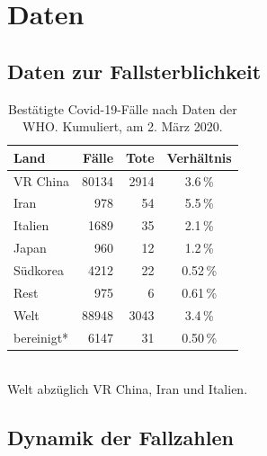 \documentclass[a4paper,11pt,fleqn,twocolumn,twoside,dvipdfmx]{scrartcl}
\numberwithin{equation}{section}
\newcommand{\strong}[1]{\textbf{#1}}
\begin{document}
\clearpage
\section{Daten}

\subsection{Daten zur Fallsterblichkeit}
\vspace{-6mm}
\begin{table}[h]
\caption{Bestätigte Covid-19-Fälle\newline
nach Daten der WHO.\newline
Kumuliert, am 2. März 2020.}
\begin{tabular}{lrrc}
\toprule
\strong{Land} & \strong{Fälle} & \strong{Tote} & \strong{Verhältnis}\\
\midrule
VR China & 80134 & 2914 & 3.6\,\%\\
Iran & 978 & 54 & 5.5\,\%\\ 
Italien & 1689 & 35 & 2.1\,\%\\
Japan & 960 & 12 &  1.2\,\%\\
Südkorea & 4212 & 22 & 0.52\,\%\\
Rest & 975 & 6 & 0.61\,\%\\
\midrule
Welt & 88948 & 3043 & 3.4\,\%\\
bereinigt* & 6147 & 31 & 0.50\,\%\\
\bottomrule
\end{tabular}\\[4pt]
{\small *Welt abzüglich VR China, Iran und Italien.}
\end{table}

\subsection{Dynamik der Fallzahlen}
\end{document}

